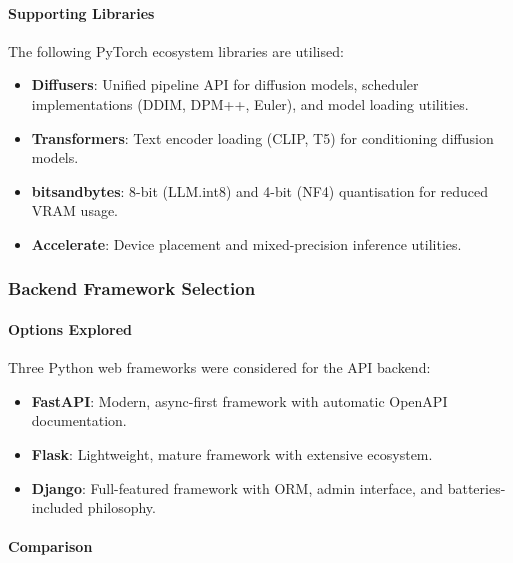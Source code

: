 \documentclass[12pt,a4paper]{report}
\begin{document}
\paragraph{Supporting Libraries}

The following PyTorch ecosystem libraries are utilised:
\begin{itemize}
    \item \textbf{Diffusers}: Unified pipeline API for diffusion models, scheduler implementations (DDIM, DPM++, Euler), and model loading utilities.
    \item \textbf{Transformers}: Text encoder loading (CLIP, T5) for conditioning diffusion models.
    \item \textbf{bitsandbytes}: 8-bit (LLM.int8) and 4-bit (NF4) quantisation for reduced VRAM usage.
    \item \textbf{Accelerate}: Device placement and mixed-precision inference utilities.
\end{itemize}

\subsubsection{Backend Framework Selection}

\paragraph{Options Explored}

Three Python web frameworks were considered for the API backend:
\begin{itemize}
    \item \textbf{FastAPI}: Modern, async-first framework with automatic OpenAPI documentation.
    \item \textbf{Flask}: Lightweight, mature framework with extensive ecosystem.
    \item \textbf{Django}: Full-featured framework with ORM, admin interface, and batteries-included philosophy.
\end{itemize}

\paragraph{Comparison}
\end{document}
